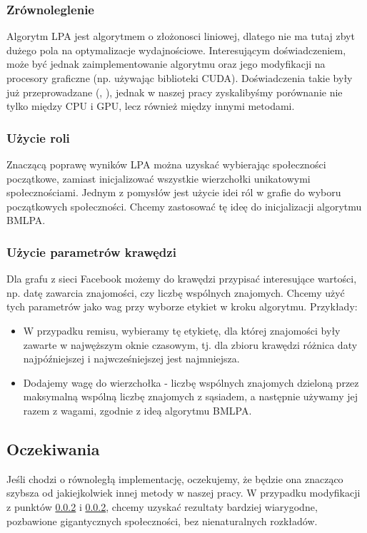 \documentclass{article}
\begin{document}
\subsubsection{Zrównoleglenie}
Algorytm LPA jest algorytmem o złożonosci liniowej, dlatego nie ma tutaj zbyt dużego pola na optymalizacje wydajnościowe. Interesującym doświadczeniem, może być jednak zaimplementowanie algorytmu oraz jego modyfikacji na procesory graficzne (np. używając biblioteki CUDA). Doświadczenia takie były już przeprowadzane (\cite{ms-paper5}, \cite{ms-paper6}), jednak w naszej pracy zyskalibyśmy porównanie nie tylko między CPU i GPU, lecz również między innymi metodami.
\subsubsection{Użycie roli}
\label{subsubsection:lparole}
Znaczącą poprawę wyników LPA można uzyskać wybierając społeczności początkowe, zamiast inicjalizować wszystkie wierzchołki unikatowymi społecznościami. Jednym z pomysłów jest użycie idei ról w grafie do wyboru początkowych społeczności\cite{ms-paper7}. Chcemy zastosować tę ideę do inicjalizacji algorytmu BMLPA.
\subsubsection{Użycie parametrów krawędzi}
\label{subsubsection:lpaedges}
Dla grafu z sieci Facebook możemy do krawędzi przypisać interesujące wartości, np. datę zawarcia znajomości, czy liczbę wspólnych znajomych. Chcemy użyć tych parametrów jako wag przy wyborze etykiet w kroku algorytmu. Przykłady:
\begin{itemize}
\item W przypadku remisu, wybieramy tę etykietę, dla której znajomości były zawarte w najwęższym oknie czasowym, tj. dla zbioru krawędzi różnica daty najpóźniejszej i najwcześniejszej jest najmniejsza.
\item Dodajemy wagę do wierzchołka - liczbę wspólnych znajomych dzieloną przez maksymalną wspólną liczbę znajomych z sąsiadem, a następnie używamy jej razem z wagami, zgodnie z ideą algorytmu BMLPA.
\end{itemize}

\subsection{Oczekiwania}
Jeśli chodzi o równoległą implementację, oczekujemy, że będzie ona znacząco szybsza od jakiejkolwiek innej metody w naszej pracy. W przypadku modyfikacji z punktów \ref{subsubsection:lparole} i \ref{subsubsection:lparole}, chcemy uzyskać rezultaty bardziej wiarygodne, pozbawione gigantycznych społeczności, bez nienaturalnych rozkładów.
\end{document}
